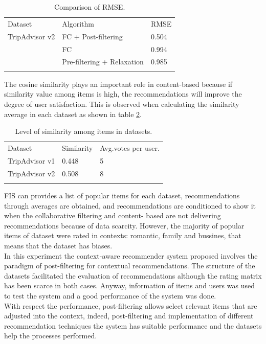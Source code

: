 \begin{table}
\centering
\small
\captionsetup{font=footnotesize}
\caption{Comparison of RMSE.}
\label{tab:4}  
\small   
\begin{tabular}{lll}
\hline\noalign{\smallskip}
Dataset & Algorithm & RMSE \\
\noalign{\smallskip}\hline\noalign{\smallskip}
TripAdvisor v2 & FC + Post-filtering  & 0.504  \\
               & FC          & 0.994  \\
               & Pre-filtering + Relaxation & 0.985  \\
\noalign{\smallskip}\hline
\end{tabular}
\end{table}
The cosine similarity plays an important role in content-based because
if similarity value among items is high, the recommendations will
improve the degree of user satisfaction. This is observed when
calculating the similarity average in each dataset as shown in table
\ref{tab:5}.
\begin{table}
\centering
\small
\captionsetup{font=footnotesize}
\caption{Level of similarity among items in datasets. }
\label{tab:5}      
\begin{tabular}{lll}
\hline\noalign{\smallskip}
Dataset  & Similarity  & Avg.votes per user. \\
\noalign{\smallskip}\hline\noalign{\smallskip}
TripAdvisor v1 & 0.448  & 5  \\
TripAdvisor v2 & 0.508  & 8  \\
\noalign{\smallskip}\hline
\end{tabular}
\end{table}
FIS can provides a list of popular items for each dataset,
recommendations through averages are obtained, and recommendations are
conditioned to show it when the collaborative filtering and content-
based are not delivering recommendations because of data scarcity.
However, the majority of popular items of dataset were rated in contexts: romantic, family and bussines, that means that the dataset has
biases.\\  In this experiment  the context-aware recommender system
proposed involves the paradigm of post-filtering for contextual
recommendations. The structure of the datasets facilitated the
evaluation of recommendations although the rating matrix has been
scarce in both cases. Anyway, information of items and users was used
to test the system and a good performance of the system was done.\\   
With respect the performance, post-filtering allows select relevant
items that are adjusted into the context, indeed, post-filtering and
implementation of different recommendation techniques the system has
suitable performance and the datasets help the processes performed.

